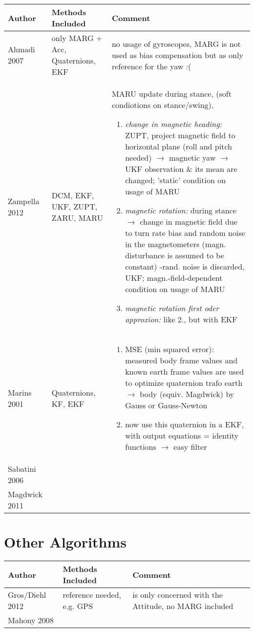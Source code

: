 \documentclass[a4paper,10pt]{article}
\begin{document}
\begin{supertabular}{C{1.8cm}C{3.5cm}C{9cm}} 
\hline
Author & Methods Included & Comment \tabularnewline
\hline
Ahmadi 2007& only MARG + Acc, Quaternions, EKF  & no usage of gyroscopes, MARG is not used as bias compensation but as only reference for the yaw :( \tabularnewline
Zampella 2012& DCM, EKF, UKF, ZUPT, ZARU, MARU & MARU update during stance, (soft condiotions on stance/swing), {\footnotesize\begin{enumerate}
                                                                                                            \item \textit{change in magnetic heading:} ZUPT, project magnetic field to horizontal plane (roll and pitch needed) $\rightarrow$ magnetic yaw  $\rightarrow$ UKF observation \& its mean are changed; 'static' condition on usage of MARU
                                                                                                            \item \textit{magnetic rotation:} during stance $\rightarrow$ change in magnetic field due to turn rate bias and random noise in the magnetometers (magn. disturbance is assumed to be constant) -rand. noise is discarded, UKF; magn.-field-dependent condition on usage of MARU
                                                                                                            \item \textit{magnetic rotation first oder approxion:} like 2., but with EKF
                                                                                                           \end{enumerate}}%
 \tabularnewline
Marins 2001& Quaternions, KF, EKF & {\footnotesize\begin{enumerate}
                                              \item MSE (min squared error): measured body frame values and known earth frame values are used to optimize quaternion trafo earth $\rightarrow$ body (equiv. Magdwick) by Gauss or Gauss-Newton
                                              \item now use this quaternion in a EKF, with output equations = identity functions $\rightarrow$ easy filter
                                             \end{enumerate}}%
 \tabularnewline
Sabatini 2006&  &  \tabularnewline
Magdwick 2011&  &  \tabularnewline
\hline
\end{supertabular}
\section{Other Algorithms}
\begin{tabular}{C{1.8cm}C{3.5cm}C{9cm}} 
\hline
Author & Methods Included & Comment \tabularnewline
\hline
Gros/Diehl 2012& reference needed, e.g. GPS &  is only concerned with the Attitude, no MARG included\tabularnewline
Mahony 2008 &  & \tabularnewline
\hline
\end{tabular}
\end{document}
